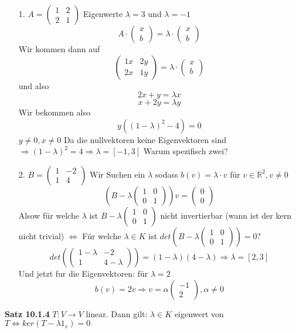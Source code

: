 \documentclass{article}
\begin{document}
\begin{itemize}
\item[1.]{$A= \begin{pmatrix}1&2\\2&1\end{pmatrix}$ Eigenwerte $\lambda = 3$ und $\lambda=-1$\\
\[A\cdot\begin{pmatrix}x\\b\end{pmatrix} = \lambda\cdot\begin{pmatrix}x\\b\end{pmatrix}\]
Wir kommen dann auf
\[\begin{pmatrix}1x&2y\\2x&1y\end{pmatrix}=\lambda\cdot\begin{pmatrix}x\\b\end{pmatrix}\]
und also
\[2x+y=\lambda x\]
\[x+2y=\lambda y\]
Wir bekommen also
\[y((1-\lambda)^2-4)=0\]
$y\neq0, x\neq0$ Da die nullvektoren keine Eigenvektoren sind $\Rightarrow (1-\lambda)^2=4\Rightarrow \lambda=[-1,3]$ Warum spezifisch zwei?}
\item[2.]{$B=\begin{pmatrix}1&-2\\1&4\end{pmatrix}$
 Wir Suchen ein $\lambda$ sodass $b(v)=\lambda\cdot v$ für $v\in \mathbb{R} ^2, v\neq0$
 \[ \left(B-\lambda\begin{pmatrix}1&0\\0&1\end{pmatrix}\right)v=\begin{pmatrix}0\\0\end{pmatrix}\] Alsow für welche $\lambda$ ist $B-\lambda\begin{pmatrix}1&0\\0&1\end{pmatrix}$ nicht invertierbar (wann ist der kern nicht trivial) $\Leftrightarrow$ Für welche $\lambda \in K$ ist $det\left(B-\lambda\begin{pmatrix}1&0\\0&1\end{pmatrix}\right)=0?$
 \[det\left(\begin{pmatrix}1-\lambda&-2\\1&4-\lambda\end{pmatrix}\right)=(1-\lambda)(4-\lambda)\Rightarrow \lambda =[2,3]\]
 Und jetzt fur die Eigenvektoren: für $\lambda = 2$
 \[b(v)=2v\Rightarrow v=\alpha\begin{pmatrix}-1\\2\end{pmatrix}, \alpha\neq0\]}
\end{itemize}
\textbf{Satz 10.1.4} $T:V\rightarrow V$ linear. Dann gilt: $\lambda \in K$ eigenwert von $T\Leftrightarrow ker(T-\lambda1_v)=0$
\end{document}
